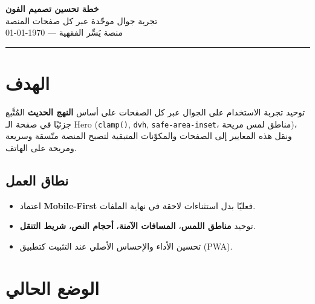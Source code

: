 \documentclass[11pt]{article}
\begin{document}
\begin{center}
  {\Huge\bfseries\color{gold} خطة تحسين تصميم الفون}\\[4pt]
  {\large\color{darkbg} تجربة جوال موحّدة عبر كل صفحات المنصة}\\[6pt]
  {\small\color{midgray} منصة يَسِّر الفقهية — \today}
\end{center}

\vspace{4pt}
\hrule
\vspace{10pt}

\section{الهدف}

\begin{goalbox}
توحيد تجربة الاستخدام على الجوال عبر كل الصفحات على أساس \textbf{النهج الحديث} المُتَّبع جزئيًا في
صفحة الـ Hero (\texttt{clamp()}, \texttt{dvh}, \texttt{safe-area-inset}، مناطق لمس مريحة)،
ونقل هذه المعايير إلى الصفحات والمكوّنات المتبقية لتصبح المنصة متّسقة وسريعة ومريحة على الهاتف.
\end{goalbox}

\subsection*{نطاق العمل}
\begin{itemize}
  \item اعتماد \textbf{Mobile-First} فعليًا بدل استثناءات لاحقة في نهاية الملفات.
  \item توحيد \textbf{مناطق اللمس}، \textbf{المسافات الآمنة}، \textbf{أحجام النص}، \textbf{شريط التنقل}.
  \item تحسين الأداء والإحساس الأصلي عند التثبيت كتطبيق (PWA).
\end{itemize}

\section{الوضع الحالي}
\end{document}
